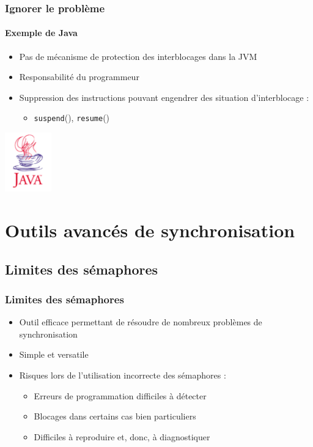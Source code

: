 \begin{frame}
\frametitle{Ignorer le problème}
\framesubtitle{Exemple de Java}
\begin{itemize}
\item Pas de mécanisme de protection des interblocages dans la JVM
\item Responsabilité du programmeur
\item Suppression des instructions pouvant engendrer des situation d’interblocage :
\begin{itemize}
\item \texttt{suspend}(), \texttt{resume}()
\end{itemize}
\end{itemize}
\includegraphics[width=2cm]{../illustration/java.png}
\end{frame}



\section{Outils avancés de synchronisation}

\subsection{Limites des sémaphores}
\begin{frame}
\frametitle{Limites des sémaphores}
\begin{itemize}
\item <1-> Outil efficace permettant de résoudre de nombreux problèmes de synchronisation
\item <1-> Simple et versatile
\item <2-> Risques lors de l’utilisation incorrecte des sémaphores :
\begin{itemize}
\item Erreurs de programmation difficiles à détecter
\item Blocages dans certains cas bien particuliers
\item Difficiles à reproduire et, donc, à diagnostiquer
\end{itemize}
\end{itemize}
\end{frame}

